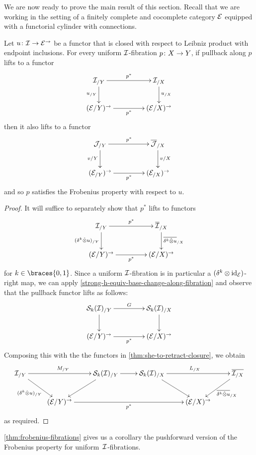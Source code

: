 \documentclass[reqno,10pt,a4paper,oneside,draft]{amsart}
\begin{document}
We are now ready to prove the main result of this section.
Recall that we are working in the setting of a finitely complete and cocomplete category $\cal{E}$ equipped with a functorial cylinder with connections.

\begin{theorem} \label{thm:frobenius-fibrations}
Let $u \co \cal{I} \to \catE^\to$ be a functor that is closed with respect to Leibniz product with endpoint inclusions.
For every uniform $\cal{I}$-fibration $p \co X \to Y$, if pullback along $p$ lifts to a functor
\[
\xymatrix@C+2em{
  \cal{I}_{/Y}
  \ar[r]^{p^*}
  \ar[d]_{u_{/Y}}
&
  \cal{I}_{/X}
  \ar[d]^{u_{/X}}
\\
  (\catE / Y)^\to
  \ar[r]_{p^*}
&
  (\catE / X)^\to
}
\]
then it also lifts to a functor
\[
\xymatrix@C+2em{
  \cal{J}_{/Y} \ar[r]^{p^*} \ar[d]_{v/Y} & \overline{\cal{J}}_{/X} \ar[d]^{v/X} \\
  (\cal{E}_{/Y})^\to \ar[r]_{p^*} & (\cal{E}_{/X})^\to
}
\]
and so $p$ satisfies the Frobenius property with respect to $u$. 
\end{theorem}

\begin{proof}
It will suffice to separately show that $p^*$ lifts to functors
\[
\xymatrix@C+2em{
  \cal{I}_{/Y}
  \ar[r]^{p^*}
  \ar[d]_{(\kcyl \hatotimes u)_{/Y}}
&
  \overline{\cal{I}}_{/X}
  \ar[d]^{ \overline{\kcyl \hatotimes u}_{/X}}
\\
  (\catE / Y)^\to
  \ar[r]_{p^*}
&
  (\catE / X)^\to
}
\]
for $k \in \braces{0, 1}$.
Since a uniform $\cal{I}$-fibration is in particular a $(\kcyl \otimes \id_\catE)$-right map, we can apply \cref{strong-h-equiv-base-change-along-fibration} and observe that the pullback functor lifts as follows:
\[
\xymatrix@C+2em{
  \cal{S}_k(\cal{I})_{/Y}
  \ar[r]^{G}
  \ar[d]
&
  \cal{S}_k(\cal{I})_{/X}
  \ar[d] \\
  (\catE / Y)^\to
  \ar[r]_{p^*}
&
  (\catE / X)^\to
}
\]
Composing this with the the functors in \cref{thm:she-to-retract-closure}, we obtain
\[
\xymatrix{
  \cal{I}_{/Y}
  \ar[rr]^{M_{/Y}}
  \ar[dr]_{(\kcyl \hatotimes u)_{/Y}} &
&
  \cal{S}_k(\cal{I})_{/Y}
  \ar[r]
  \ar[dl]
&
  \cal{S}_k(\cal{I})_{/X}
  \ar[rr]^{L_{/X}}
  \ar[dr]
& &
  \overline{\cal{I}_{/X}}
  \ar[dl]^{\overline{\kcyl \hatotimes u}_{/X}}
\\ &
  (\catE/Y)^\to
  \ar[rrr]_{p^*}
&&&
  (\catE/X)^\to
}
\]
as required.
\end{proof}

\cref{thm:frobenius-fibrations} gives us a corollary the pushforward version of the Frobenius property for
uniform~$\cal{I}$-fibrations.
\end{document}
